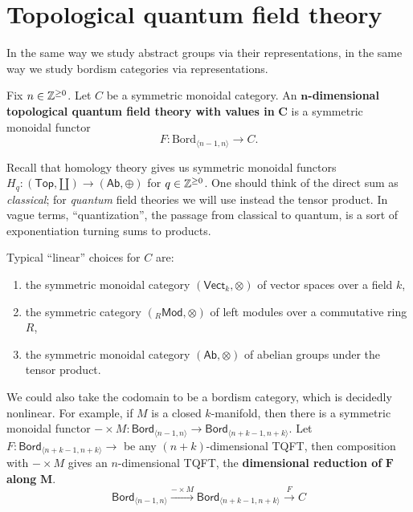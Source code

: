 

\section{Topological quantum field theory} 
In the same way we study abstract groups via their representations, in the same way we study bordism categories via representations.
\begin{definition}[]
    Fix $n \in \mathbb{Z} ^{\geq 0}$. Let $C$ be a symmetric monoidal category. An $ \mathbf n$\textbf{-dimensional topological quantum field theory with values in} $\mathbf C$ is a symmetric monoidal functor \[
    F \colon \mathrm{Bord}_{\langle n-1,n \rangle } \to  C.
    \] 
\end{definition}
Recall that homology theory gives us symmetric monoidal functors $H_q \colon \left( \mathsf{Top} ,\amalg \right)  \to \left( \mathsf{Ab} ,\oplus \right) $ for $q \in \mathbb{Z} ^{\geq 0}$. One should think of the direct sum as \emph{classical}; for \emph{quantum} field theories we will use instead the tensor product. In vague terms, ``quantization'', the passage from classical to quantum, is a sort of exponentiation turning sums to products.
\begin{example}
    Typical ``linear'' choices for $C$ are:
    \begin{enumerate}[label=(\roman*)]
    \setlength\itemsep{-.2em}
\item the symmetric monoidal category $\left( \mathsf{Vect} _k,\otimes \right) $ of vector spaces over a field $k$,
\item the symmetric category $({}_R \mathsf{Mod} ,\otimes) $ of left modules over a commutative ring $R$,
\item the symmetric monoidal category $\left( \mathsf{Ab} ,\otimes \right) $ of abelian groups under the tensor product.
    \end{enumerate}
    We could also take the codomain to be a bordism category, which is decidedly nonlinear. For example, if $M$ is a closed $k$-manifold, then there is a symmetric monoidal functor $- \times M \colon \mathsf{Bord} _{\langle n-1,n \rangle } \to \mathsf{Bord} _{\langle n+k-1,n+k \rangle }$. Let $F \colon \mathsf{Bord} _{\langle n+k-1,n+k \rangle } \to $ be any $\left( n+k \right) $-dimensional TQFT, then composition with $- \times M$ gives an $n$-dimensional TQFT, the \textbf{dimensional reduction of} $\mathbf F$ \textbf{along} $\mathbf M$. \[
    \mathsf{Bord} _{\langle n-1,n \rangle } \xrightarrow{- \times M}  \mathsf{Bord} _{\langle n+k-1,n+k \rangle } \xrightarrow{F} C
    \] 
\end{example}

